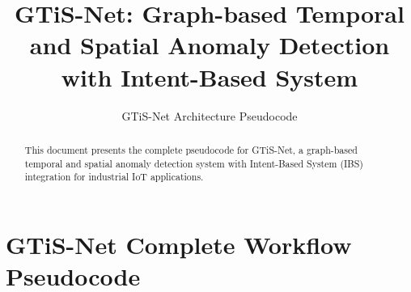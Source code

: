\documentclass[conference]{IEEEtran}
\begin{document}
\title{GTiS-Net: Graph-based Temporal and Spatial Anomaly Detection with Intent-Based System}

\author{GTiS-Net Architecture Pseudocode}

\maketitle

\begin{abstract}
This document presents the complete pseudocode for GTiS-Net, a graph-based temporal and spatial anomaly detection system with Intent-Based System (IBS) integration for industrial IoT applications.
\end{abstract}

\section{GTiS-Net Complete Workflow Pseudocode}
\end{document}
